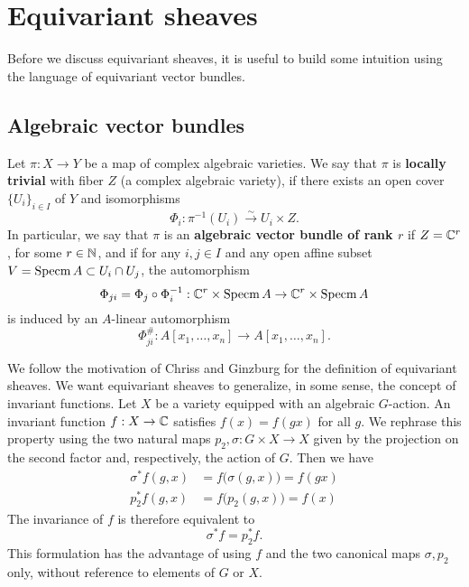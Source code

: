 \section{Equivariant sheaves}

Before we discuss equivariant sheaves, it is useful to build some intuition using
the language of equivariant vector bundles.

\subsection{Algebraic vector bundles}

\begin{definition}
    Let $\pi:X\to Y$ be a map of complex algebraic varieties. We say that $\pi$ is \textbf{locally trivial}
    with fiber $Z$ (a complex algebraic variety), if there exists an open cover $\{U_i\}_{i\in I}$ of $Y$ and isomorphisms
    \[\Phi_i:\pi^{-1}(U_i)\xrightarrow{\sim} U_i\times Z.\]
    In particular, we say that $\pi$ is an \textbf{algebraic vector bundle of rank $r$} if $Z=\mathbb{C}^r$, for some $r\in\mathbb{N}$,
    and if for any $i,j\in I$ and any open affine subset $V=\operatorname{Specm} A\subset U_i\cap U_j$, the automorphism
    \[\Phi_{ji}=\Phi_j\circ\Phi_i^{-1}:\mathbb{C}^r\times \operatorname{Specm} A\to\mathbb{C}^r\times \operatorname{Specm} A\]
    is induced by an $A$-linear automorphism 
    \[\Phi_{ji}^\#: A[x_1,\ldots,x_n]\to A[x_1,\ldots,x_n].\]
\end{definition}



We follow the motivation of Chriss and Ginzburg  for the definition of equivariant sheaves.
We want equivariant sheaves to generalize, in some sense, the concept of invariant functions. Let $X$ be a variety
equipped with an algebraic $G$-action. An invariant function $f: X \to \mathbb{C}$ satisfies $f(x) = f(gx)$ for all $g$.
We rephrase this property using the two natural maps $p_2,\sigma : G\times X \to X$ given by the projection on the second
factor and, respectively, the action of $G$. Then we have
\begin{align*}
\sigma^* f(g,x) &= f\big(\sigma(g,x)\big) = f(gx) \\
p_2^* f(g,x) &= f\big(p_2(g,x)\big) = f(x)
\end{align*}
The invariance of $f$ is therefore equivalent to
\begin{equation}
\label{eq:finv}
\sigma^*f = p_2^*f .
\end{equation}
This formulation has the advantage of using $f$ and
the two canonical maps $\sigma,p_2$ only, without reference to elements of $G$ or $X$.

